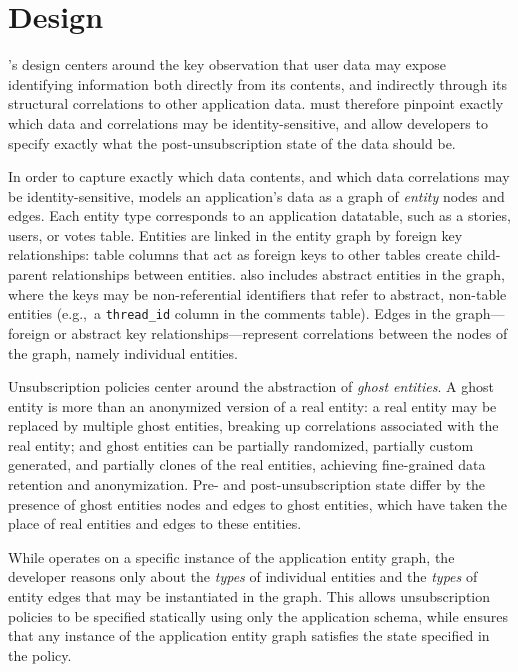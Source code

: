 \section{Design}
\sys's design centers around the key observation that user data may expose identifying information
both directly from its contents, and indirectly through its structural correlations to other
application data. \sys must therefore pinpoint exactly which data and correlations may be
identity-sensitive, and allow developers to specify exactly what the post-unsubscription state of
the data should be.

In order to capture exactly which data contents, and which data correlations may be
identity-sensitive, \sys models an application's data as a graph of \emph{entity} nodes and edges.
Each entity type corresponds to an application datatable, such as a stories, users, or votes table.
Entities are linked in the entity graph by foreign key relationships: table columns that act as
foreign keys to other tables create child-parent relationships between entities.  \sys also includes
abstract entities in the graph, where the keys may be non-referential identifiers that refer to
abstract, non-table entities (e.g.,\ a \texttt{thread\_id} column in the comments table).  Edges in
the graph---foreign or abstract key relationships---represent correlations between the nodes of the
graph, namely individual entities.

Unsubscription policies center around the abstraction of \emph{ghost entities}. A ghost entity is
more than an anonymized version of a real entity: a real entity may be replaced by multiple ghost
entities, breaking up correlations associated with the real entity; and ghost entities can be partially
randomized, partially custom generated, and partially clones of the real entities, achieving
fine-grained data retention and anonymization. Pre- and post-unsubscription state differ by the
presence of ghost entities nodes and edges to ghost entities, which have taken the place of real
entities and edges to these entities.

While \sys operates on a specific instance of the application entity graph, the developer reasons
only about the \emph{types} of individual entities and the \emph{types} of entity edges that may be
instantiated in the graph. This allows unsubscription policies to be specified statically using only
the application schema, while \sys ensures that any instance of the application entity graph
satisfies the state specified in the policy.

